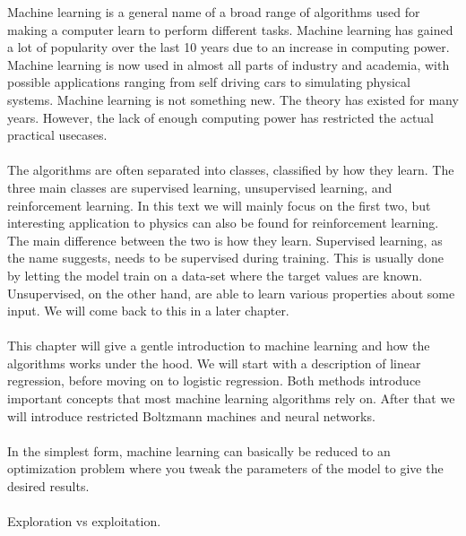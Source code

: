 Machine learning is a general name of a broad range of algorithms used for making a computer learn to perform different tasks. Machine learning has gained a lot of popularity over the last 10 years due to an increase in computing power. Machine learning is now used in almost all parts of industry and academia, with possible applications ranging from self driving cars to simulating physical systems. Machine learning is not something new. The theory has existed for many years. However, the lack of enough computing power has restricted the actual practical usecases.  
\\
\\
The algorithms are often separated into classes, classified by how they learn. The three main classes are supervised learning, unsupervised learning, and reinforcement learning. In this text we will mainly focus on the first two, but interesting application to physics can also be found for reinforcement learning\cite{}. The main difference between the two is how they learn. Supervised learning, as the name suggests, needs to be supervised during training. This is usually done by letting the model train on a data-set where the target values are known. Unsupervised, on the other hand, are able to learn various properties about some input. We will come back to this in a later chapter. 
\\
\\
This chapter will give a gentle introduction to machine learning and how the algorithms works under the hood. We will start with a description of linear regression, before moving on to logistic regression. Both methods introduce important concepts that most machine learning algorithms rely on. After that we will introduce restricted Boltzmann machines and neural networks. 
\\
\\
In the simplest form, machine learning can basically be reduced to an optimization problem where you tweak the parameters of the model to give the desired results. 
\\
\\
Exploration vs exploitation. 
